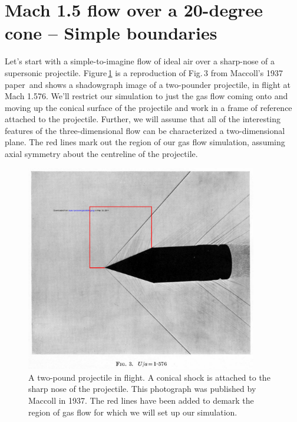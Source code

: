 
\section{Mach 1.5 flow over a 20-degree cone -- Simple boundaries}
\label{cone20-simple-sec}
%
Let's start with a simple-to-imagine flow of ideal air over a sharp-nose of a supersonic projectile.
Figure\,\ref{cone20-flight-fig} is a reproduction of Fig.\,3 from Maccoll's 1937 paper\,\cite{maccoll_1937a} 
and shows a shadowgraph image of a two-pounder projectile, in flight at Mach 1.576.
We'll restrict our simulation to just the gas flow coming onto and moving up the conical surface 
of the projectile and work in a frame of reference attached to the projectile.
Further, we will assume that all of the interesting features of the three-dimensional flow can be 
characterized a two-dimensional plane.
The red lines mark out the region of our gas flow simulation, 
assuming axial symmetry about the centreline of the projectile.

\begin{figure}[htbp]
\begin{center}
\includegraphics[width=0.9\textwidth, viewport=76 168 949 761, clip=true]{../2D/cone20-simple/maccoll-1937-fig3.pdf}
\end{center}
\caption{A two-pound projectile in flight.  A conical shock is attached to the sharp nose of the projectile. 
	 This photograph was published by Maccoll in 1937.
	 The red lines have been added to demark the region of gas flow for which we will set up our simulation.}
\label{cone20-flight-fig}
\end{figure}

